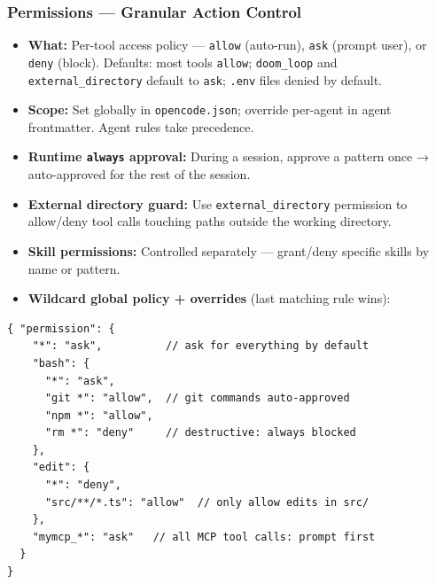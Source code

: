 \begin{frame}[fragile]\frametitle{Permissions — Granular Action Control}
  \begin{itemize}
    \item \textbf{What:} Per-tool access policy — \texttt{allow} (auto-run), \texttt{ask} (prompt user), or \texttt{deny} (block). Defaults: most tools \texttt{allow}; \texttt{doom\_loop} and \texttt{external\_directory} default to \texttt{ask}; \texttt{.env} files denied by default.
    \item \textbf{Scope:} Set globally in \texttt{opencode.json}; override per-agent in agent frontmatter. Agent rules take precedence.

    \item \textbf{Runtime \texttt{always} approval:} During a session, approve a pattern once → auto-approved for the rest of the session.
    \item \textbf{External directory guard:} Use \texttt{external\_directory} permission to allow/deny tool calls touching paths outside the working directory.
    \item \textbf{Skill permissions:} Controlled separately — grant/deny specific skills by name or pattern.
	\item \textbf{Wildcard global policy + overrides} (last matching rule wins):

  \end{itemize}
  
\begin{lstlisting}
{ "permission": {
    "*": "ask",          // ask for everything by default
    "bash": {
      "*": "ask",
      "git *": "allow",  // git commands auto-approved
      "npm *": "allow",
      "rm *": "deny"     // destructive: always blocked
    },
    "edit": {
      "*": "deny",
      "src/**/*.ts": "allow"  // only allow edits in src/
    },
    "mymcp_*": "ask"   // all MCP tool calls: prompt first
  }
}
\end{lstlisting}  
\end{frame}

